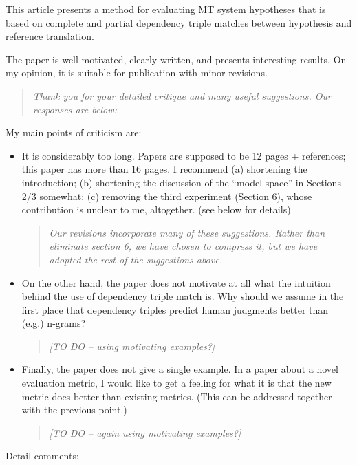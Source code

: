 \documentclass[letterpaper,12pt]{article}
\newenvironment{response}
{\begin{quotation} \it}
  {\end{quotation}}
\begin{document}
This article presents a method for evaluating MT system hypotheses
that is based on complete and partial dependency triple matches
between hypothesis and reference translation.

The paper is well motivated, clearly written, and presents interesting
results. On my opinion, it is suitable for publication with minor
revisions. 
\begin{response}
  Thank you for your detailed critique and many useful
  suggestions. Our responses are below:
\end{response}
My main points of criticism are:

\begin{itemize}
\item It is considerably too long. Papers are supposed to be 12 pages
  + references; this paper has more than 16 pages. I recommend (a)
  shortening the introduction; (b) shortening the discussion of the
  ``model space'' in Sections 2/3 somewhat; (c) removing the third
  experiment (Section 6), whose contribution is unclear to me,
  altogether. (see below for details)
  \begin{response}
    Our revisions incorporate many of these suggestions. Rather than
    eliminate section 6, we have chosen to compress it, but we have
    adopted the rest of the suggestions above.
  \end{response}

\item On the other hand, the paper does not motivate at all what the
  intuition behind the use of dependency triple match is. Why should
  we assume in the first place that dependency triples predict human
  judgments better than (e.g.) n-grams?
  \begin{response}
    [TO DO -- using motivating examples?]
  \end{response}

\item Finally, the paper does not give a single example. In a paper
  about a novel evaluation metric, I would like to get a feeling for
  what it is that the new metric does better than existing
  metrics. (This can be addressed together with the previous point.)
  \begin{response}
    [TO DO -- again using motivating examples?]
  \end{response}
\end{itemize}

Detail comments:
\end{document}
